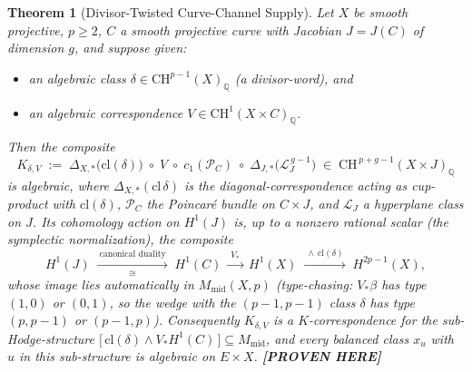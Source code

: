 \documentclass[11pt]{article}
\newtheorem{theorem}{Theorem}
\newcommand{\PROVEN}{\textbf{[PROVEN HERE]}}
\newcommand{\Q}{\mathbb{Q}}
\newcommand{\CH}{\mathrm{CH}}
\begin{document}
\begin{theorem}[Divisor-Twisted Curve-Channel Supply]\label{thm:s5}
Let $X$ be smooth projective, $p\ge2$, $C$ a smooth projective curve with
Jacobian $J=J(C)$ of dimension $g$, and suppose given:
\begin{itemize}
\item an algebraic class $\delta\in\CH^{p-1}(X)_\Q$ (a divisor-word), and
\item an algebraic correspondence $V\in\CH^{1}(X\times C)_\Q$.
\end{itemize}
Then the composite
\[
K_{\delta,V}\;:=\;\Delta_{X,*}\bigl(\mathrm{cl}(\delta)\bigr)\;\circ\;V\;\circ\;
c_{1}(\mathcal P_{C})\;\circ\;\Delta_{J,*}\bigl(\mathcal L_{J}^{\,g-1}\bigr)
\;\in\;\CH^{\,p+g-1}(X\times J)_\Q
\]
is algebraic, where $\Delta_{X,*}(\mathrm{cl}\,\delta)$ is the
diagonal-correspondence acting as cup-product with
$\mathrm{cl}(\delta)$, $\mathcal P_{C}$ the Poincaré bundle on $C\times J$,
and $\mathcal L_J$ a hyperplane class on $J$. Its cohomology action on
$H^{1}(J)$ is, up to a nonzero rational scalar (the symplectic
normalization), the composite
\[
H^{1}(J)\;\xrightarrow[\ \cong\ ]{\ \text{canonical duality}\ }\;H^{1}(C)\;
\xrightarrow{\ V_*\ }\;H^{1}(X)\;\xrightarrow{\ \wedge\,\mathrm{cl}(\delta)\ }\;
H^{2p-1}(X),
\]
whose image lies automatically in $M_{\mathrm{mid}}(X,p)$ (type-chasing:
$V_*\beta$ has type $(1,0)$ or $(0,1)$, so the wedge with the
$(p-1,p-1)$ class $\delta$ has type $(p,p-1)$ or $(p-1,p)$).
Consequently $K_{\delta,V}$ is a $K$-correspondence for the sub-Hodge-structure
$\bigl[\,\mathrm{cl}(\delta)\wedge V_*H^{1}(C)\,\bigr]\subseteq M_{\mathrm{mid}}$,
and every balanced class $x_{u}$ with $u$ in this sub-structure is algebraic
on $E\times X$.
\PROVEN{}
\end{theorem}
\end{document}
